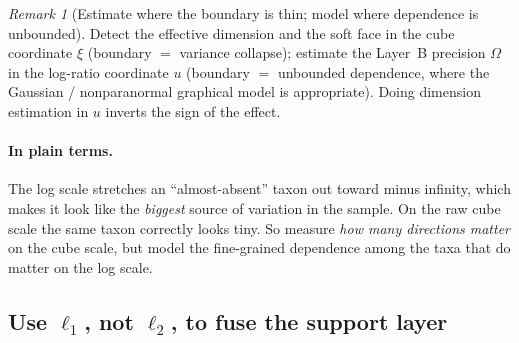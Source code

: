 \documentclass[11pt]{article}
\theoremstyle{definition}
\theoremstyle{plain}
\theoremstyle{remark}
\newtheorem{remark}[definition]{Remark}
\newcommand{\1}{\mathbf{1}}
\newcommand{\Prec}{\Omega}
\begin{document}
\begin{remark}[Estimate where the boundary is thin; model where dependence is
  unbounded]\label{rem:trap}
Detect the effective dimension and the soft face in the cube coordinate $\xi$
(boundary $=$ variance collapse); estimate the Layer~B precision $\Prec$ in the
log-ratio coordinate $u$ (boundary $=$ unbounded dependence, where the Gaussian /
nonparanormal graphical model is appropriate). Doing dimension estimation in $u$
inverts the sign of the effect.
\end{remark}

\paragraph{In plain terms.}
The log scale stretches an ``almost-absent'' taxon out toward minus infinity,
which makes it look like the \emph{biggest} source of variation in the sample. On
the raw cube scale the same taxon correctly looks tiny. So measure \emph{how many
directions matter} on the cube scale, but model the fine-grained dependence among
the taxa that do matter on the log scale.

\subsection{Use $\ell_1$, not $\ell_2$, to fuse the support layer}
\label{sec:l1fusion}
\end{document}
